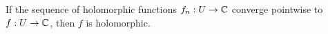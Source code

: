 \documentclass{homework}
\begin{document}
                                                                                                                                                                                                                                                                                                                                                                  \begin{problem}\label{uniform-convergence-holomorphic}If the sequence of
                                                                                                                                                                                                                                                                                                                                                                    holomorphic functions $f_n : U \to \mathbb{C}$ converge pointwise to
                                                                                                                                                                                                                                                                                                                                                                      $f : U \to \mathbb{C}$, then $f$ is holomorphic.
                                                                                                                                                                                                                                                                                                                                                                      \end{problem}
\end{document}
